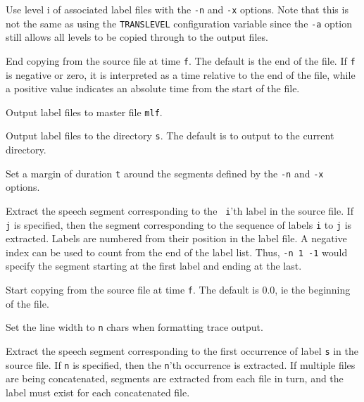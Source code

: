 \begin{optlist}

   Use level i of associated label files with the \texttt{-n}
   and  \texttt{-x} options.  Note that this is not the same as using the
 \texttt{TRANSLEVEL} configuration variable since the  \texttt{-a} option
still allows all levels to be copied through to the output files.

   End copying from the source file at time \texttt{f}.  The
 default is the end of the file. If \texttt{f} is negative or zero, it is
 interpreted as a time relative to the end of the file, while a positive value
 indicates an absolute time from the start of the file.

  Output label files to master file \texttt{mlf}.

  Output label files to the directory \texttt{s}.
    The default is to output to the current directory.
  
  Set a margin of duration \texttt{t} around the
    segments defined by the \texttt{-n} and \texttt{-x} options. 

  Extract the speech segment corresponding to the {\tt
     i}'th label in the source file.  If \texttt{j} is specified, then the
     segment corresponding to the sequence of labels \texttt{i} to \texttt{j}
     is extracted. Labels are numbered from their position in the
     label file.  A negative index can be used to count from the end
    of the label list.   Thus, \texttt{-n 1 -1} would specify the segment
    starting at the first label and ending at the last.

   Start copying from the source file at time \texttt{f}. 
    The default is 0.0, ie the beginning of the file.

   Set the line width to \texttt{n} chars when formatting
    trace output.

   Extract the speech segment corresponding to the
       first occurrence of label \texttt{s} in the source file.  If \texttt{n}
       is specified, then the \texttt{n}'th occurrence is extracted. If
       multiple files are being concatenated, segments are extracted
       from each file in turn, and the label must exist for each
       concatenated file.

\stdoptF
\stdoptG
\stdoptI
\stdoptL
\stdoptO
\stdoptP
\stdoptX

\end{optlist}

